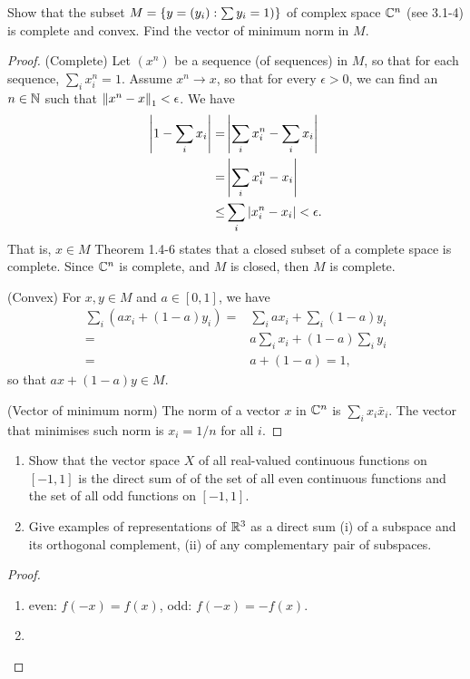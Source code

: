 \begin{exercise}{2}
Show that the subset $M=\{y=(y_i): \sum y_i=1)\}$ of complex space $\mathbb{C}^n$ (see 3.1-4) is complete and convex.
Find the vector of minimum norm in $M$.
\end{exercise}
\begin{proof}
(Complete)
Let $(x^n)$ be a sequence (of sequences) in $M$, so that for each sequence, $\sum_i x^n_i=1$.
Assume $x^n\to x$, so that for every $\epsilon>0$, we can find an $n\in\mathbb{N}$ such that $\left\lVert x^n-x\right\rVert_1<\epsilon$.
We have
\begin{align*}
    \left\lvert 1-\sum_i x_i\right\rvert
    =& \left\lvert \sum_i x^n_i - \sum_i x_i\right\rvert\\
    =& \left\lvert \sum_i x^n_i - x_i\right\rvert\\
    \leq& \sum_i\left\lvert x^n_i - x_i\right\rvert
    <\epsilon.
\end{align*}
That is, $x\in M$
Theorem 1.4-6 states that a closed subset of a complete space is complete.
Since $\mathbb{C}^n$ is complete, and $M$ is closed, then $M$ is complete.

(Convex)
For $x,y\in M$ and $a\in[0,1]$, we have
\begin{align*}
    \sum_i (ax_i+(1-a)y_i)
    =& \sum_i ax_i + \sum_i (1-a)y_i\\
    =& a\sum_i x_i + (1-a)\sum_i y_i\\
    =& a + (1-a) = 1,
\end{align*}
so that $ax+(1-a)y\in M$.

(Vector of minimum norm)
The norm of a vector $x$ in $\mathbb{C}^n$ is $\sum_i x_i\bar{x}_i$.
The vector that minimises such norm is $x_i=1/n$ for all $i$.
\end{proof}

\begin{exercise}{3}
\begin{enumerate}
    \item Show that the vector space $X$ of all real-valued continuous functions on $[-1,1]$ is the direct sum of of the set of all even continuous functions and the set of all odd functions on $[-1,1]$.
    \item Give examples of representations of $\mathbb{R}^3$ as a direct sum (i) of a subspace and its orthogonal complement, (ii) of any complementary pair of subspaces.
\end{enumerate}
\end{exercise}
\begin{proof}
\begin{enumerate}
    \item even: $f(-x) = f(x)$, odd: $f(-x) = -f(x)$.
    \item 
\end{enumerate}
\end{proof}

